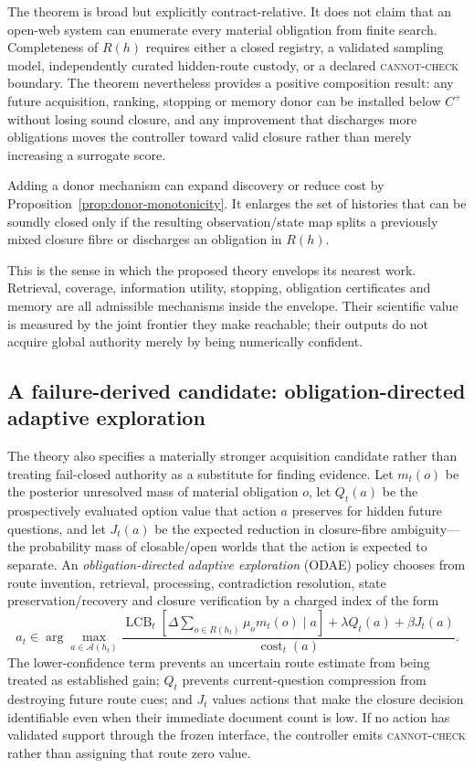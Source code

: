 The theorem is broad but explicitly contract-relative.  It does not claim that
an open-web system can enumerate every material obligation from finite search.
Completeness of $R(h)$ requires either a closed registry, a validated sampling
model, independently curated hidden-route custody, or a declared
\textsc{cannot-check} boundary.  The theorem nevertheless provides a positive
composition result: any future acquisition, ranking, stopping or memory donor
can be installed below $C^+$ without losing sound closure, and any improvement
that discharges more obligations moves the controller toward valid closure
rather than merely increasing a surrogate score.

\begin{corollary}
Adding a donor mechanism can expand discovery or reduce cost by
Proposition~\ref{prop:donor-monotonicity}.  It enlarges the set of histories that
can be soundly closed only if the resulting observation/state map splits a
previously mixed closure fibre or discharges an obligation in $R(h)$.
\end{corollary}

This is the sense in which the proposed theory envelops its nearest work.
Retrieval, coverage, information utility, stopping, obligation certificates and
memory are all admissible mechanisms inside the envelope.  Their scientific
value is measured by the joint frontier they make reachable; their outputs do
not acquire global authority merely by being numerically confident.

\subsection{A failure-derived candidate: obligation-directed adaptive
exploration}

The theory also specifies a materially stronger acquisition candidate rather
than treating fail-closed authority as a substitute for finding evidence.  Let
$m_t(o)$ be the posterior unresolved mass of material obligation $o$, let
$Q_t(a)$ be the prospectively evaluated option value that action $a$ preserves
for hidden future questions, and let $J_t(a)$ be the expected reduction in
closure-fibre ambiguity---the probability mass of closable/open worlds that the
action is expected to separate.  An \emph{obligation-directed adaptive
exploration} (ODAE) policy chooses from route invention, retrieval, processing,
contradiction resolution, state preservation/recovery and closure verification
by a charged index of the form
\[
 a_t\in\arg\max_{a\in\mathcal A(h_t)}
 \frac{
   \operatorname{LCB}_t\!\left[
     \Delta\sum_{o\in R(h_t)}\mu_o m_t(o)\mid a
   \right]
   +\lambda Q_t(a)+\beta J_t(a)
 }{\operatorname{cost}_t(a)}.
\]
The lower-confidence term prevents an uncertain route estimate from being
treated as established gain; $Q_t$ prevents current-question compression from
destroying future route cues; and $J_t$ values actions that make the closure
decision identifiable even when their immediate document count is low.  If no
action has validated support through the frozen interface, the controller emits
\textsc{cannot-check} rather than assigning that route zero value.

